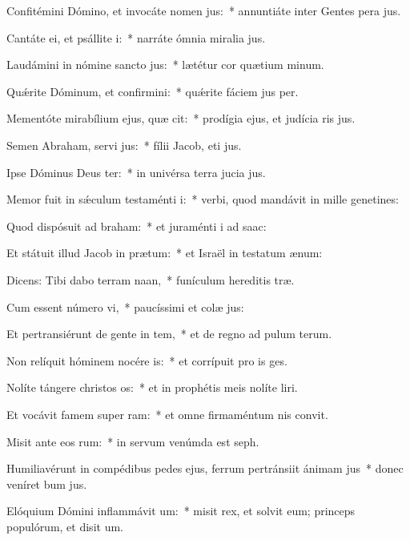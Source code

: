 \item Confitémini Dómino, et invocáte nomen jus:~* annuntiáte inter Gentes pera jus.
\item Cantáte ei, et psállite i:~* narráte ómnia miralia jus.
\item Laudámini in nómine sancto jus:~* lætétur cor quætium minum.
\item Quǽrite Dóminum, et confirmini:~* quǽrite fáciem jus per.
\item Mementóte mirabílium ejus, quæ cit:~* prodígia ejus, et judícia ris jus.
\item Semen Abraham, servi jus:~* fílii Jacob, eti jus.
\item Ipse Dóminus Deus ter:~* in univérsa terra jucia jus.
\item Memor fuit in sǽculum testaménti i:~* verbi, quod mandávit in mille genetines:
\item Quod dispósuit ad braham:~* et juraménti i ad saac:
\item Et státuit illud Jacob in prætum:~* et Israël in testatum ænum:
\item Dicens: Tibi dabo terram naan,~* funículum hereditis træ.
\item Cum essent número vi,~* paucíssimi et colæ jus:
\item Et pertransiérunt de gente in tem,~* et de regno ad pulum terum.
\item Non relíquit hóminem nocére is:~* et corrípuit pro is ges.
\item Nolíte tángere christos os:~* et in prophétis meis nolíte liri.
\item Et vocávit famem super ram:~* et omne firmaméntum nis convit.
\item Misit ante eos rum:~* in servum venúmda est seph.
\item Humiliavérunt in compédibus pedes ejus, ferrum pertránsiit ánimam jus~* donec veníret bum jus.
\item Elóquium Dómini inflammávit um:~* misit rex, et solvit eum; princeps populórum, et disit um.
